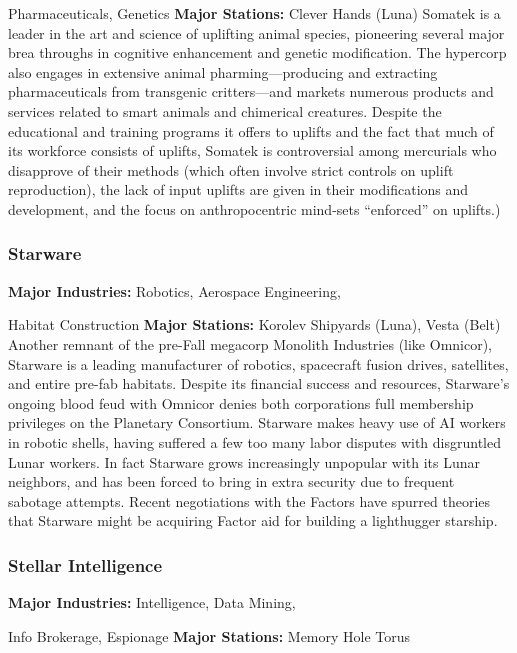 Pharmaceuticals, Genetics
\textbf{Major Stations:} Clever Hands (Luna)
Somatek is a leader in the art and science of uplifting animal species, pioneering several major brea 
throughs in cognitive enhancement and genetic 
modification. The hypercorp also engages in extensive 
animal pharming—producing and extracting pharmaceuticals from transgenic critters—and markets 
numerous products and services related to smart animals and chimerical creatures. Despite the educational 
and training programs it offers to uplifts and the fact 
that much of its workforce consists of uplifts, Somatek 
is controversial among mercurials who disapprove of 
their methods (which often involve strict controls on 
uplift reproduction), the lack of input uplifts are given 
in their modifications and development, and the focus 
on anthropocentric mind-sets ``enforced'' on uplifts.)

\subsubsection{Starware}

\textbf{Major Industries:} Robotics, Aerospace Engineering, 

Habitat Construction
\textbf{Major Stations:} Korolev Shipyards (Luna), Vesta (Belt)
Another remnant of the pre-Fall megacorp Monolith 
Industries (like Omnicor), Starware is a leading manufacturer of robotics, spacecraft fusion drives, satellites, 
and entire pre-fab habitats. Despite its financial success and resources, Starware's ongoing blood feud 
with Omnicor denies both corporations full membership privileges on the Planetary Consortium. Starware 
makes heavy use of AI workers in robotic shells, 
having suffered a few too many labor disputes with 
disgruntled Lunar workers. In fact Starware grows increasingly unpopular with its Lunar neighbors, and has 
been forced to bring in extra security due to frequent 
sabotage attempts. Recent negotiations with the Factors have spurred theories that Starware might be acquiring Factor aid for building a lighthugger starship.

\subsubsection{Stellar Intelligence}

\textbf{Major Industries:} Intelligence, Data Mining, 

Info Brokerage, Espionage
\textbf{Major Stations:} Memory Hole Torus 


